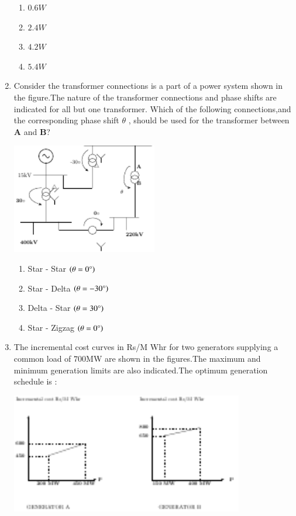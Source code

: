 \documentclass[journal,12pt,onecolumn]{IEEEtran}
\theoremstyle{remark}
\begin{document}
\begin{enumerate}
    \begin{enumerate}
        \item $0.6 W$
        \item $2.4 W$
        \item $4.2 W$
        \item $5.4 W$\\
    \end{enumerate}
    \item Consider the transformer connections is a part of a power system shown in the figure.The nature of the transformer connections and phase shifts are indicated for all but one transformer.
    Which of the following connections,and the corresponding phase shift $\theta$ , should be used for the transformer between $\mathbf{A}$ and $\mathbf{B}$?
		 \begin{center}
\includegraphics[width=0.5\textwidth]{figs/fig3/main} %
\end{center}

    \begin{enumerate}
        \item Star - Star $\left(\theta = 0\degree\right)$
        \item Star - Delta $\left(\theta = -30\degree\right)$
        \item Delta - Star $\left(\theta = 30\degree\right)$
        \item Star - Zigzag $\left(\theta = 0\degree\right)$\\
    \end{enumerate}
    \item The incremental cost curves in Rs/M Whr for two generators supplying a common load of $700$MW are shown in the figures.The maximum and minimum generation limits are also indicated.The optimum generation schedule is $\colon$
	     \begin{center}
\includegraphics[width=0.8\textwidth]{figs/fig4/main} %
\end{center}


\end{enumerate}
\end{document}
